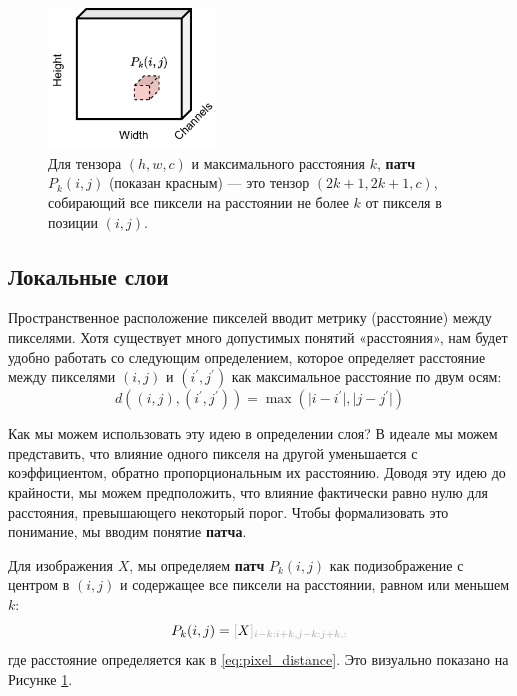 \begin{figure}
    \centering
    \hspace{1em}\includegraphics[width=0.4\textwidth]{images/patch}
    \caption{Для тензора $(h,w,c)$ и максимального расстояния $k$, \textbf{патч} $P_k(i,j)$ (показан красным) — это тензор $(2k+1,2k+1,c)$, собирающий все пиксели на расстоянии не более $k$ от пикселя в позиции $(i,j)$.}
    \label{fig:patch}
\end{figure}

\subsection{Локальные слои}

Пространственное расположение пикселей вводит метрику (расстояние) между пикселями. Хотя существует много допустимых понятий «расстояния», нам будет удобно работать со следующим определением, которое определяет расстояние между пикселями $(i,j)$ и $(i^\prime, j^\prime)$ как максимальное расстояние по двум осям:
%
\begin{equation}
d((i,j), (i^\prime,j^\prime))=\max(\lvert i-i^\prime \rvert,\lvert j-j^\prime\rvert)
\label{eq:pixel_distance}
%
\end{equation}

Как мы можем использовать эту идею в определении слоя? В идеале мы можем представить, что влияние одного пикселя на другой уменьшается с коэффициентом, обратно пропорциональным их расстоянию. Доводя эту идею до крайности, мы можем предположить, что влияние фактически равно нулю для расстояния, превышающего некоторый порог. Чтобы формализовать это понимание, мы вводим понятие \textbf{патча}.

\begin{definition} \addbottle
Для изображения $X$, мы определяем \textbf{патч} $P_{k}(i,j)$ как подизображение с центром в $(i,j)$ и содержащее все пиксели на расстоянии, равном или меньшем $k$:
%
$$
P_{k}(i,j) = \idx{X}{i-k:i+k,j-k:j+k,:}
$$
%
где расстояние определяется как в \eqref{eq:pixel_distance}. Это визуально показано на Рисунке \ref{fig:patch}.
%
\end{definition}



